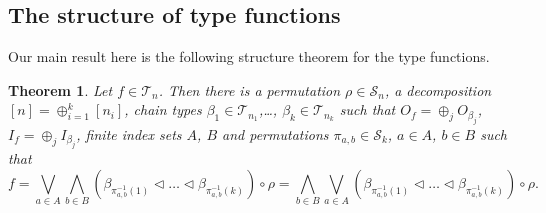 \documentclass[12pt]{article}
\newtheorem{theorem}{Theorem}
\theoremstyle{definition}
\theoremstyle{remark}
\def\Te{\mathcal T}
\def\permut{\mathscr{S}}
\def\vtl{\vartriangleleft}
\begin{document}
\subsection{The structure of type functions}

Our main result here is the  following structure theorem for the type functions.


\begin{theorem}\label{thm:structure}
Let  $f\in \Te_n$. Then there is a permutation $\rho\in \permut_n$, a decomposition
$[n]=\oplus_{i=1}^k[n_i]$, chain types 
$\beta_1\in \Te_{n_1}$,\dots, $\beta_k\in
\Te_{n_k}$ such that $O_f=\oplus_j O_{\beta_j}$, $I_f=\oplus_j I_{\beta_j}$, finite index sets $A$, $B$ and permutations $\pi_{a,b}\in
\permut_k$, $a\in A$, $b\in B$ such that 
\[
f=\bigvee_{a\in A}\bigwedge_{b\in B} (\beta_{\pi^{-1}_{a,b}(1)}\vtl \dots \vtl
\beta_{\pi^{-1}_{a,b}(k)})\circ \rho=\bigwedge_{b\in B}\bigvee_{a\in A}(\beta_{\pi^{-1}_{a,b}(1)}\vtl \dots \vtl
\beta_{\pi^{-1}_{a,b}(k)})\circ \rho.
\]
%
\end{theorem}
\end{document}
